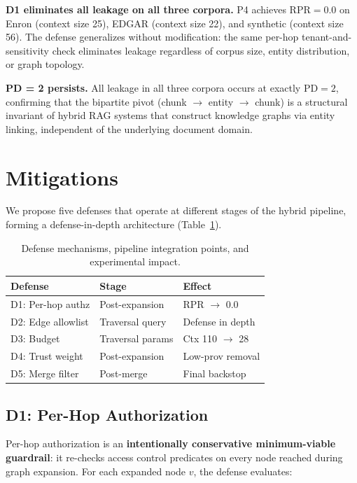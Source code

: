 \documentclass[letterpaper,twocolumn,10pt]{article}
\begin{document}
\textbf{D1 eliminates all leakage on all three corpora.} P4 achieves
$\text{RPR} = 0.0$ on Enron (context size 25), EDGAR (context size
22), and synthetic (context size 56). The defense generalizes without
modification: the same per-hop tenant-and-sensitivity check eliminates
leakage regardless of corpus size, entity distribution, or graph
topology.

\textbf{PD = 2 persists.} All leakage in all three corpora occurs at
exactly $\text{PD} = 2$, confirming that the bipartite pivot
(chunk $\to$ entity $\to$ chunk) is a structural invariant of hybrid
RAG systems that construct knowledge graphs via entity linking,
independent of the underlying document domain.

\section{Mitigations}
\label{sec:mitigations}

We propose five defenses that operate at different stages of the
hybrid pipeline, forming a defense-in-depth architecture
(Table~\ref{tab:defenses}).

\begin{table}[t]
\centering
\caption{Defense mechanisms, pipeline integration points, and
  experimental impact.}
\label{tab:defenses}
\small
\begin{tabular}{l|l|l}
\toprule
\textbf{Defense} & \textbf{Stage} & \textbf{Effect} \\
\midrule
D1: Per-hop authz & Post-expansion & RPR $\to$ 0.0 \\
D2: Edge allowlist & Traversal query & Defense in depth \\
D3: Budget & Traversal params & Ctx 110 $\to$ 28 \\
D4: Trust weight & Post-expansion & Low-prov removal \\
D5: Merge filter & Post-merge & Final backstop \\
\bottomrule
\end{tabular}
\end{table}

\subsection{D1: Per-Hop Authorization}

Per-hop authorization is an \textbf{intentionally conservative
minimum-viable guardrail}: it re-checks access control predicates on
every node reached during graph expansion. For each expanded node $v$, the
defense evaluates:
\end{document}

